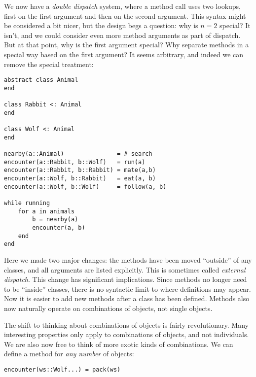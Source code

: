 We now have a \emph{double dispatch} system, where a method call
uses two lookups, first on the first argument and then on the
second argument.
This syntax might be considered a bit nicer, but the design
begs a question: why is $n=2$ special?
It isn't, and we could consider even more method arguments as part of
dispatch.
But at that point, why is the first argument special?
Why separate methods in a special way based on the first argument?
It seems arbitrary, and indeed we can remove the special treatment:

\vspace{-3ex}
\begin{singlespace}
\begin{verbatim}
abstract class Animal
end

class Rabbit <: Animal
end

class Wolf <: Animal
end

nearby(a::Animal)               = # search
encounter(a::Rabbit, b::Wolf)   = run(a)
encounter(a::Rabbit, b::Rabbit) = mate(a,b)
encounter(a::Wolf, b::Rabbit)   = eat(a, b)
encounter(a::Wolf, b::Wolf)     = follow(a, b)

while running
    for a in animals
        b = nearby(a)
        encounter(a, b)
    end
end
\end{verbatim}
\end{singlespace}

Here we made two major changes: the methods have been moved ``outside''
of any classes, and all arguments are listed explicitly.
This is sometimes called \emph{external dispatch}.
This change has significant implications.
Since methods no longer need to be ``inside'' classes, there is no syntactic
limit to where definitions may appear.
Now it is easier to add new methods after a class has been defined.
Methods also now naturally operate on combinations of objects, not single objects.

The shift to thinking about combinations of objects is fairly revolutionary.
Many interesting properties only apply to combinations of objects, and not
individuals.
We are also now free to think of more exotic kinds of combinations.
We can define a method for \emph{any number} of objects:

\begin{verbatim}
encounter(ws::Wolf...) = pack(ws)
\end{verbatim}

